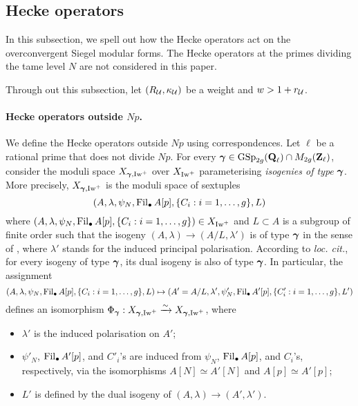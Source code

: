 \subsection{Hecke operators}\label{subsection: Hecke operators on the overconvergent automorphic forms}
In this subsection, we spell out how the Hecke operators act on the overconvergent Siegel modular forms. The Hecke operators at the primes dividing the tame level $N$ are not considered in this paper.

Through out this subsection, let $(R_{\operatorname{\mathcal{U}}}, \kappa_{\operatorname{\mathcal{U}}})$ be a weight and $w>1+r_{\operatorname{\mathcal{U}}}$.

\paragraph{Hecke operators outside $Np$.} We define the Hecke operators outside $Np$ using correspondences. Let $\ell$ be a rational prime that does not divide $Np$. For every $\operatorname{\boldsymbol{\gamma}}\in \operatorname{GSp}_{2g}(\operatorname{\mathbf{Q}}_{\ell})\cap M_{2g}(\operatorname{\mathbf{Z}}_{\ell})$, consider the moduli space $X_{\operatorname{\boldsymbol{\gamma}}, \operatorname{Iw}^+}$ over $X_{\operatorname{Iw}^+}$ parameterising \textit{isogenies of type} $\operatorname{\boldsymbol{\gamma}}$. More precisely, $X_{\operatorname{\boldsymbol{\gamma}}, \operatorname{Iw}^+}$ is the moduli space of sextuples $$(A, \lambda, \psi_N, \operatorname{Fil}_{\bullet}A[p], \{C_i: i=1, \ldots, g\}, L)$$ where $(A, \lambda, \psi_N, \operatorname{Fil}_{\bullet}A[p],\{C_i: i=1, \ldots, g\})\in X_{\operatorname{Iw}^+}$ and $L\subset A$ is a subgroup of finite order such that the isogeny $(A, \lambda)\rightarrow (A/L, \lambda')$ is of type $\operatorname{\boldsymbol{\gamma}}$ in the sense of \cite[Chapter VII, \S 3]{Faltings-Chai}, where $\lambda'$ stands for the induced principal polarisation. According to \emph{loc. cit.}, for every isogeny of type $\operatorname{\boldsymbol{\gamma}}$, its dual isogeny is also of type $\operatorname{\boldsymbol{\gamma}}$. In particular, the assignment $$(A, \lambda, \psi_N, \operatorname{Fil}_{\bullet}A[p], \{C_i: i=1, \ldots, g\}, L)\mapsto (A'=A/L, \lambda', \psi'_N, \operatorname{Fil}_{\bullet}A'[p], \{C'_i: i=1, \ldots, g\}, L')$$ defines an isomorphism $\Phi_{\operatorname{\boldsymbol{\gamma}}}: X_{\operatorname{\boldsymbol{\gamma}}, \operatorname{Iw}^+}\xrightarrow[]{\sim}X_{\operatorname{\boldsymbol{\gamma}}, \operatorname{Iw}^+}$, where 
\begin{itemize}
\item $\lambda'$ is the induced polarisation on $A'$;
\item $\psi'_N$, $\operatorname{Fil}_{\bullet}A'[p]$, and $C'_i$'s are induced from $\psi_N$, $\operatorname{Fil}_{\bullet}A[p]$, and $C_i$'s, respectively, via the isomorphisms $A[N]\simeq A'[N]$ and $A[p]\simeq A'[p]$;
\item $L'$ is defined by the dual isogeny of $(A,\lambda)\rightarrow (A',\lambda')$.
\end{itemize}

